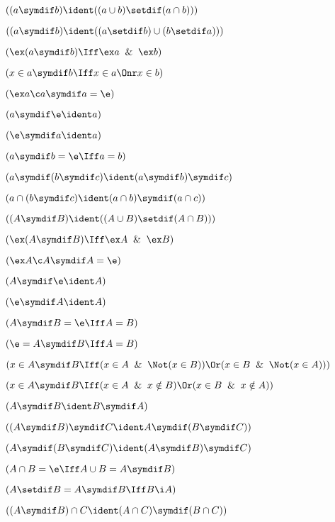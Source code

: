 
 $((a \symdif b)\ident((a \cup b) \setdif (a \cap b)))$


 $((a \symdif b)\ident((a \setdif b) \cup (b \setdif a)))$

 $(\ex(a\symdif b) \Iff \ex a \And \ex b)$

 $( x \in a\symdif b \Iff x \in  a \Onr x \in b)$

 $(\ex a  \c  a \symdif a = \e)$

 $(a \symdif \e \ident a)$

 $(\e \symdif a \ident a)$

 $( a \symdif b = \e \Iff a = b)$

 $(a \symdif (b \symdif c) \ident (a \symdif b) \symdif c)$

 $(a \cap (b \symdif c) \ident (a \cap b) \symdif (a \cap c))$

 $((A \symdif B)\ident ((A \cup B) \setdif (A \cap B)))$

 $(\ex (A\symdif B) \Iff \ex A \And \ex B)$

 $(\ex A \c A \symdif A = \e)$

 $(A \symdif \e \ident A)$

 $(\e \symdif A \ident A)$

 $(A \symdif B = \e \Iff A = B)$

 $(\e = A \symdif B \Iff A = B)$

 $(x \in A\symdif B\Iff (x \in A \And \Not(x \in B))
\Or ( x \in B \And \Not(x \in A)))$

 $(x \in A\symdif B\Iff (x \in A \And x \notin B)
\Or ( x \in B \And x \notin A))$

 $(A \symdif B \ident B \symdif A)$

 $((A \symdif B )\symdif C \ident A \symdif (B\symdif C)) $

 $(A \symdif (B \symdif C )\ident (A \symdif B)\symdif C) $

 $(A \cap B = \e \Iff A \cup B = A \symdif B)$

 $(A \setdif B = A \symdif B \Iff B \i A)$

 $((A \symdif B) \cap C \ident (A \cap C)\symdif (B\cap C))$

